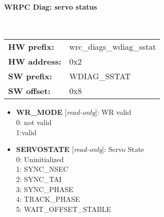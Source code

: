 \paragraph*{WRPC Diag: servo status}\mbox{}\\\vskip 6pt
\begin{tabular}{l l }
{\bf HW prefix:}  & wrc\_diags\_wdiag\_sstat\\
{\bf HW address:}  & 0x2\\
{\bf SW prefix:}  & WDIAG\_SSTAT\\
{\bf SW offset:}  & 0x8\\
\end{tabular}


\vspace{12pt}
\noindent
{}

\begin{itemize}
\item \begin{small}
{\bf 
WR\_MODE
} [\emph{read-only}]: WR valid
\\
0: not valid\\                     1:valid
\end{small}
\item \begin{small}
{\bf 
SERVOSTATE
} [\emph{read-only}]: Servo State
\\
0: Uninitialized\\                     1: SYNC\_NSEC\\                     2: SYNC\_TAI\\                     3: SYNC\_PHASE\\                     4: TRACK\_PHASE\\                     5: WAIT\_OFFSET\_STABLE
\end{small}
\end{itemize}
